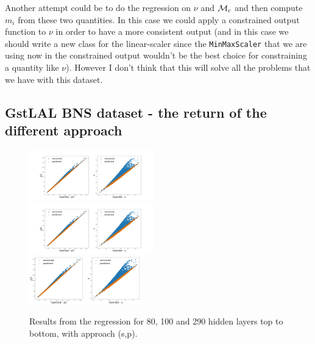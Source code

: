 \documentclass[prd,aps,twocolumn,a4paper,showkeys,nofootinbib]{revtex4-1}
\def\Mc{{\cal M}_c}
\begin{document}
Another attempt could be to do the regression on $\nu$ and $\Mc$ and then compute $m_i$
from these two quantities. 
In this case we could apply a constrained output function to $\nu$  in order to have a more
consistent output
(and in this case we should write a new class for the linear-scaler since the 
\texttt{MinMaxScaler} that we are using now in the constrained output wouldn't be the best 
choice for constraining a quantity like $\nu$). 
However I don't think that this will solve all the problems that we have
with this dataset.

\subsection{GstLAL BNS dataset - the return of the different approach}
\label{sec:GstLAL3}
%
\begin{figure}[]
  \center
  \includegraphics[width=0.48\textwidth]{./Figs/80_resultReg}\\
  \includegraphics[width=0.48\textwidth]{./Figs/100_resultReg}\\
  \includegraphics[width=0.43\textwidth]{./Figs/290_}
  \caption{\label{fig:approach3_comparison1} Results from the regression 
  for 80, 100 and 290 hidden layers top to bottom, with approach (s,p).}
\end{figure}
%
\end{document}
